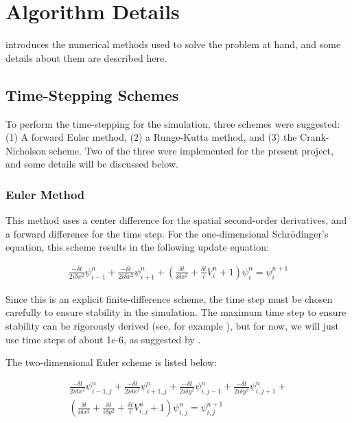 \documentclass[letterpaper,12pt]{article}
\begin{document}
\section{Algorithm Details}

\citep{reference} introduces the numerical methods used to solve the problem at hand, and some details about them are described here.

\subsection{Time-Stepping Schemes}

To perform the time-stepping for the simulation, three schemes were suggested: (1) A forward Euler method, (2) a Runge-Kutta method, and (3) the Crank-Nicholson scheme. Two of the three were implemented for the present project, and some details will be discussed below.

\subsubsection{Euler Method}

This method uses a center difference for the spatial second-order derivatives, and a forward difference for the time step.  For the one-dimensional Schr\"{o}dinger's equation, this scheme results in the following update equation:

\begin{equation}
\begin{split}
\frac{-\delta t}{2i\delta x^2}\psi^n_{i-1} + 
\frac{-\delta t}{2i\delta x^2}\psi^n_{i+1} +
( \frac{\delta t}{i\delta x^2} + \frac{\delta t} {i}V^n_{i} + 1)\psi^n_{i}  = \psi^{n+1}_{i} 
\end{split}
\end{equation}

Since this is an explicit finite-difference scheme, the time step must be chosen carefully to ensure stability in the simulation. The maximum time step to ensure stability can be rigorously derived (see, for example \citep{eulerstab}), but for now, we will just use time steps of about 1e-6, as suggested by \citep{reference}.

The two-dimensional Euler scheme is listed below:

\begin{equation}
\begin{split}
\frac{-\delta t}{2i\delta x^2}\psi^n_{i-1,j} + 
\frac{-\delta t}{2i\delta x^2}\psi^n_{i+1,j} +
\frac{-\delta t}{2i\delta y^2}\psi^n_{i,j-1} + 
 \frac{-\delta t}{2i\delta y^2}\psi^n_{i,j+1} + \\ 
(  \frac{\delta t}{i\delta x^2} + \frac{\delta t}{i\delta y^2} + \frac{\delta t} {i}V^n_{i,j} + 1)\psi^n_{i,j}  = \psi^{n+1}_{i,j} 
\end{split}
\end{equation}
\end{document}

